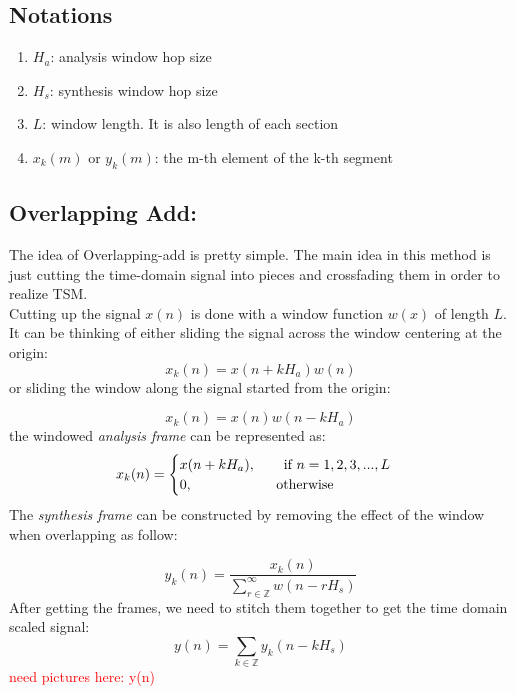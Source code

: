 \documentclass[11pt]{article}
\begin{document}
\subsection{Notations}
\begin{enumerate}[label=\roman*)]
  \item $H_a$: analysis window hop size 
  \item $H_s$: synthesis window hop size
  \item $L$: window length. It is also length of each section 
  \item $x_k(m)$ or $y_k(m)$: the m-th element of the k-th segment
\end{enumerate}

\subsection{Overlapping Add:}
The idea of Overlapping-add is pretty simple. The main idea in this method is just cutting the time-domain signal into pieces and crossfading them in order to realize TSM.  \\
Cutting up the signal $x(n)$ is done with a window function $w(x)$ of length $L$. It can be thinking of either sliding the signal across the window centering at the origin: 
\begin{equation}
 x_{k}(n) =x(n+kH_a)w(n) 
\label{eq : }
\end{equation}
or sliding the window along the signal started from the origin: 

\begin{equation}
 x_{k}(n) =x(n)w(n-kH_a) 
\label{eq : }
\end{equation}
the windowed \textit{analysis frame} can be represented as: 
\begin{equation}
x_k(n) = \begin{cases}
        x(n +kH_a),  \text{\qquad if $n = 1,2,3,...,L$}\\
        0, \text{\qquad  \qquad \qquad otherwise} 
\end{cases}
\label{eq : }
\end{equation}
The \textit{synthesis frame} can be constructed by removing the effect of the window when overlapping as follow: 

\begin{equation}
        y_k(n) = \frac{x_{k}(n)}{\sum_{r\in \mathbb{Z}}^{\infty}w(n-rH_s) }
\label{eq : }
\end{equation}
After getting the frames, we need to stitch them together to get the time domain scaled signal: 
\begin{equation}
        y(n) =\sum_{k \in \mathbb{Z}} y_{k}(n - kH_s) \label{eq:}
\end{equation}
\textcolor{red}{need pictures here: y(n)}
\end{document}
